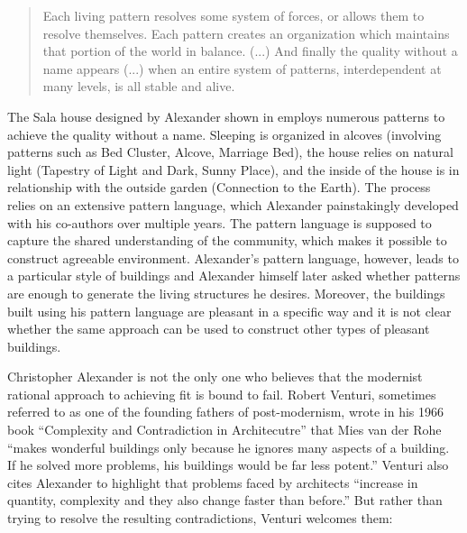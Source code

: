 \begin{quote}
Each living pattern resolves some system of forces, or allows them to resolve themselves.
Each pattern creates an organization which maintains that portion of the world in balance.
(...) And finally the quality without a name appears (...) when an entire system of patterns,
interdependent at many levels, is all stable and alive.
\end{quote}

The Sala house designed by Alexander shown in  employs numerous patterns to achieve
the quality without a name. Sleeping is organized in alcoves (involving patterns such as Bed Cluster,
Alcove, Marriage Bed), the house relies on natural light (Tapestry of Light and Dark, Sunny Place),
and the inside of the house is in relationship with the outside garden (Connection to the Earth).
The process relies on an extensive pattern language, which Alexander painstakingly developed with
his co-authors over multiple years. The pattern language is supposed to capture the shared
understanding of the community, which makes it possible to construct agreeable environment.
Alexander's pattern language, however, leads to a particular style of buildings and Alexander
himself later asked whether patterns are enough to generate the living structures he desires.
Moreover, the buildings built using his pattern language are pleasant in a specific way and it is
not clear whether the same approach can be used to construct other types of pleasant
buildings.

Christopher Alexander is not the only one who believes that the modernist rational approach
to achieving fit is bound to fail. Robert Venturi, sometimes referred to as one of the founding
fathers of post-modernism, wrote in his 1966 book ``Complexity and
Contradiction in Architecutre'' that Mies van der Rohe ``makes wonderful buildings only because
he ignores many aspects of a building. If he solved more problems, his buildings would be far
less potent.'' Venturi also cites Alexander
to highlight that problems faced by architects ``increase in quantity, complexity and they also
change faster than before.''
But rather than trying to resolve the resulting contradictions, Venturi welcomes them:

